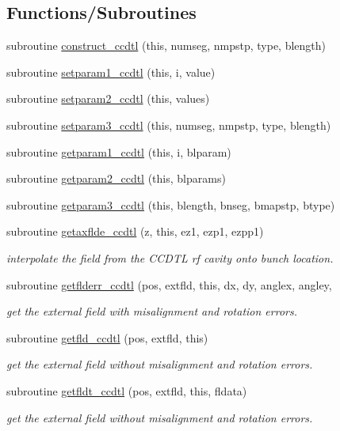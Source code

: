 \subsection*{Functions/\+Subroutines}
\begin{DoxyCompactItemize}
\item 
subroutine \mbox{\hyperlink{namespaceccdtlclass_aaa94d8179c6d59c2d3e81b64e8237962}{construct\+\_\+ccdtl}} (this, numseg, nmpstp, type, blength)
\item 
subroutine \mbox{\hyperlink{namespaceccdtlclass_adedaabef796136ab3b22dcc923243cfd}{setparam1\+\_\+ccdtl}} (this, i, value)
\item 
subroutine \mbox{\hyperlink{namespaceccdtlclass_aa32b5665906eac3911db6712a5710f97}{setparam2\+\_\+ccdtl}} (this, values)
\item 
subroutine \mbox{\hyperlink{namespaceccdtlclass_a3632b0f42925964cedb7778792da563f}{setparam3\+\_\+ccdtl}} (this, numseg, nmpstp, type, blength)
\item 
subroutine \mbox{\hyperlink{namespaceccdtlclass_a027b988ab66d8b89dabf46f5e45d82f5}{getparam1\+\_\+ccdtl}} (this, i, blparam)
\item 
subroutine \mbox{\hyperlink{namespaceccdtlclass_a8455f87d9ac20671adf737902c8b90d8}{getparam2\+\_\+ccdtl}} (this, blparams)
\item 
subroutine \mbox{\hyperlink{namespaceccdtlclass_a529631343d4306c6c486d72e2a6696a3}{getparam3\+\_\+ccdtl}} (this, blength, bnseg, bmapstp, btype)
\item 
subroutine \mbox{\hyperlink{namespaceccdtlclass_adb7b1c30d3fcb087a5064911ccd4fd1d}{getaxflde\+\_\+ccdtl}} (z, this, ez1, ezp1, ezpp1)
\begin{DoxyCompactList}\small\item\em interpolate the field from the C\+C\+D\+TL rf cavity onto bunch location. \end{DoxyCompactList}\item 
subroutine \mbox{\hyperlink{namespaceccdtlclass_ab81d1b262943e405eebe3bfef401bb97}{getflderr\+\_\+ccdtl}} (pos, extfld, this, dx, dy, anglex, angley,
\begin{DoxyCompactList}\small\item\em get the external field with misalignment and rotation errors. \end{DoxyCompactList}\item 
subroutine \mbox{\hyperlink{namespaceccdtlclass_a62eb43f6a732d52951d468e91a2312cb}{getfld\+\_\+ccdtl}} (pos, extfld, this)
\begin{DoxyCompactList}\small\item\em get the external field without misalignment and rotation errors. \end{DoxyCompactList}\item 
subroutine \mbox{\hyperlink{namespaceccdtlclass_aa1b97607af3b788522be9e22c479ce2a}{getfldt\+\_\+ccdtl}} (pos, extfld, this, fldata)
\begin{DoxyCompactList}\small\item\em get the external field without misalignment and rotation errors. \end{DoxyCompactList}\end{DoxyCompactItemize}
